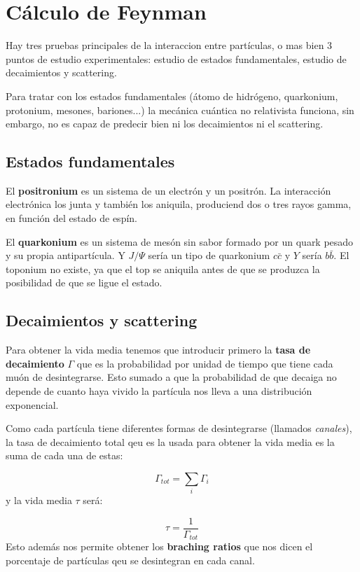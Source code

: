 \chapter{Cálculo de Feynman}

Hay tres pruebas principales de la interaccion entre partículas, o mas bien 3 puntos de estudio experimentales: estudio de estados fundamentales, estudio de decaimientos y scattering. 

Para tratar con los estados fundamentales (átomo de hidrógeno, quarkonium, protonium, mesones, bariones...) la mecánica cuántica no relativista funciona, sin embargo, no es capaz de predecir bien ni los decaimientos ni el scattering.


\section{Estados fundamentales}

El \textbf{positronium} es un sistema de un electrón y un positrón. La interacción electrónica los junta y también  los aniquila, produciend dos o tres rayos gamma, en función del estado de espín.

El \textbf{quarkonium} es un sistema de mesón sin sabor formado por un quark pesado y su propia antipartícula. Y $J/\Psi$ sería un tipo de quarkonium $c\bar{c}$ y $Y$ sería $b\bar{b}$. El toponium no existe, ya que el top se aniquila antes de que se produzca la posibilidad de que se ligue el estado. 

\section{Decaimientos y scattering}

Para obtener la vida media tenemos que introducir primero la \textbf{tasa de decaimiento} $\Gamma$ que es la probabilidad por unidad de tiempo que tiene cada muón de desintegrarse. Esto sumado a que la probabilidad de que decaiga no depende de cuanto haya vivido la partícula nos lleva a una distribución exponencial. 

Como cada partícula tiene diferentes formas de desintegrarse (llamados \textit{canales}), la tasa de decaimiento total qeu es la usada para obtener la vida media es la suma de cada una de estas:

\begin{equation}
    \Gamma_{tot} = \sum_i \Gamma_i
\end{equation}
y la vida media $\tau$ será:

\begin{equation}
    \tau = \frac{1}{\Gamma_{tot}}
\end{equation}
Esto además nos permite obtener los \textbf{braching ratios} que nos dicen el porcentaje de partículas qeu se desintegran en cada canal. 


